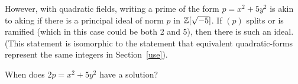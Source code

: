 However, with quadratic fields, writing a prime of the form $p = x^2+5y^2$ is akin to aking if there is a principal ideal of norm $p$ in $\mathbb{Z}[\sqrt{-5}]$. If $(p)$ splits or is ramified (which in this case could be both 2 and 5), then there is such an ideal. (This statement is isomorphic to the statement that equivalent quadratic-forms represent the same integers in Section~\ref{use}).
\begin{ex}
When does $2p = x^2+5y^2$ have a solution?
\end{ex}
